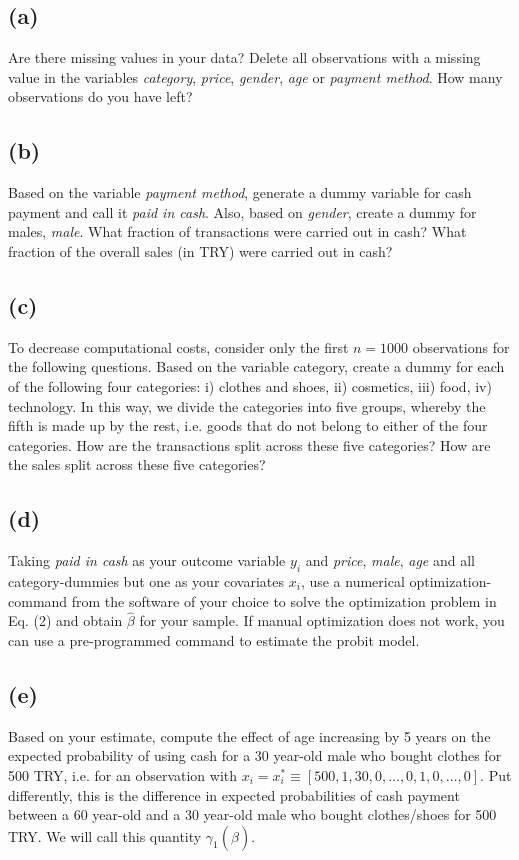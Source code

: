 \documentclass[a4paper,12pt]{article} %
\theoremstyle{nonitalic}
\begin{document}
\subsection*{(a)}
Are there missing values in your data? Delete all observations with a missing value in the variables \textit{category}, \textit{price}, \textit{gender}, \textit{age} or \textit{payment method}. How many observations do you have left?

\subsection*{(b)}
Based on the variable \textit{payment method}, generate a dummy variable for cash payment and call it \textit{paid in cash}. Also, based on \textit{gender}, create a dummy for males, \textit{male}. What fraction of transactions were carried out in cash? What fraction of the overall sales (in TRY) were carried out in cash?

\subsection*{(c)}
To decrease computational costs, consider only the first $n = 1000$ observations for the following questions.
Based on the variable category, create a dummy for each of the following four categories: 
i) clothes and shoes, 
ii) cosmetics, 
iii) food, 
iv) technology. 
In this way, we divide the categories into five groups, 
whereby the fifth is made up by the rest, 
i.e. goods that do not belong to either of the four categories. 
How are the transactions split across these five categories? 
How are the sales split across these five categories?

\subsection*{(d)}
Taking \textit{paid in cash} as your outcome variable $y_i$ and \textit{price}, \textit{male}, \textit{age} and all category-dummies but one as your covariates $x_i$, 
use a numerical optimization-command from the software of your choice to solve the optimization problem in Eq. (2) 
and obtain $\hat{\beta}$ for your sample. If manual optimization does not work, 
you can use a pre-programmed command to estimate the probit model.

\subsection*{(e)}
Based on your estimate, compute the effect of age increasing by 5 years on the expected probability of using cash for a 30 year-old male who bought clothes for 500 TRY, i.e. for an observation with $x_i = x^*_i \equiv [500, 1, 30, 0, \ldots, 0, 1, 0, \ldots, 0]$. 
Put differently, this is the difference in expected probabilities 
of cash payment between a 60 year-old and a 30 year-old male who
bought clothes/shoes for 500 TRY. 
We will call this quantity $\gamma_1(\hat{\beta})$.
\end{document}

